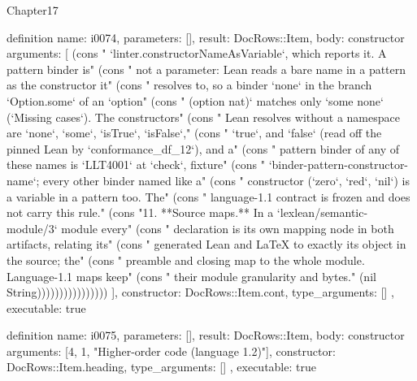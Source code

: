 \begin{lexlean}{Chapter17}
\begin{semanticmodule}
definition{
  name: i0074,
  parameters: [],
  result: DocRows::Item,
  body: constructor{
    arguments: [
      (cons "    `linter.constructorNameAsVariable`, which reports it. A pattern binder is" (cons "    not a parameter: Lean reads a bare name in a pattern as the constructor it" (cons "    resolves to, so a binder `none` in the branch `Option.some` of an `option" (cons "    (option nat)` matches only `some none` (`Missing cases`). The constructors" (cons "    Lean resolves without a namespace are `none`, `some`, `isTrue`, `isFalse`," (cons "    `true`, and `false` (read off the pinned Lean by `conformance_df_12`), and a" (cons "    pattern binder of any of these names is `LLT4001` at `check`, fixture" (cons "    `binder-pattern-constructor-name`; every other binder named like a" (cons "    constructor (`zero`, `red`, `nil`) is a variable in a pattern too. The" (cons "    language-1.1 contract is frozen and does not carry this rule." (cons "11. **Source maps.** In a `lexlean/semantic-module/3` module every" (cons "    declaration is its own mapping node in both artifacts, relating its" (cons "    generated Lean and LaTeX to exactly its object in the source; the" (cons "    preamble and closing map to the whole module. Language-1.1 maps keep" (cons "    their module granularity and bytes." (nil String))))))))))))))))
    ],
    constructor: DocRows::Item.cont,
    type_arguments: []
  },
  executable: true
}

definition{
  name: i0075,
  parameters: [],
  result: DocRows::Item,
  body: constructor{
    arguments: [4, 1, "Higher-order code (language 1.2)"],
    constructor: DocRows::Item.heading,
    type_arguments: []
  },
  executable: true
}


\end{semanticmodule}
\end{lexlean}
